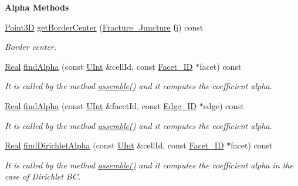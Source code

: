 \begin{Indent}{\bf Alpha Methods}\par
\begin{DoxyCompactItemize}
\item 
\hyperlink{classFVCode3D_1_1Point3D}{Point3D} \hyperlink{classFVCode3D_1_1StiffMatrix_a2702adc80c0667f24005a16672de0d39}{get\+Border\+Center} (\hyperlink{classFVCode3D_1_1StiffMatrix_ab6572f8976a3d7fc0d54d73888764252}{Fracture\+\_\+\+Juncture} fj) const 
\begin{DoxyCompactList}\small\item\em Border center. \end{DoxyCompactList}\item 
\hyperlink{namespaceFVCode3D_a40c1f5588a248569d80aa5f867080e83}{Real} \hyperlink{classFVCode3D_1_1StiffMatrix_a2365673b4791819e78c4c593e2f63b28}{find\+Alpha} (const \hyperlink{namespaceFVCode3D_a4bf7e328c75d0fd504050d040ebe9eda}{U\+Int} \&cell\+Id, const \hyperlink{classFVCode3D_1_1StiffMatrix_a317efdb4e4f2da856c747d1e0b80db20}{Facet\+\_\+\+ID} $\ast$facet) const 
\begin{DoxyCompactList}\small\item\em It is called by the method \hyperlink{classFVCode3D_1_1StiffMatrix_af63e81815a2ba8bd62a2156a80adce55}{assemble()} and it computes the coefficient alpha. \end{DoxyCompactList}\item 
\hyperlink{namespaceFVCode3D_a40c1f5588a248569d80aa5f867080e83}{Real} \hyperlink{classFVCode3D_1_1StiffMatrix_ae11e5b16122aed418d90e18530007e11}{find\+Alpha} (const \hyperlink{namespaceFVCode3D_a4bf7e328c75d0fd504050d040ebe9eda}{U\+Int} \&facet\+Id, const \hyperlink{classFVCode3D_1_1StiffMatrix_ac82be26370aa6eb17714078d9a2bf8df}{Edge\+\_\+\+ID} $\ast$edge) const 
\begin{DoxyCompactList}\small\item\em It is called by the method \hyperlink{classFVCode3D_1_1StiffMatrix_af63e81815a2ba8bd62a2156a80adce55}{assemble()} and it computes the coefficient alpha. \end{DoxyCompactList}\item 
\hyperlink{namespaceFVCode3D_a40c1f5588a248569d80aa5f867080e83}{Real} \hyperlink{classFVCode3D_1_1StiffMatrix_aec36126e4870fc3f94a2d36b831c739e}{find\+Dirichlet\+Alpha} (const \hyperlink{namespaceFVCode3D_a4bf7e328c75d0fd504050d040ebe9eda}{U\+Int} \&cell\+Id, const \hyperlink{classFVCode3D_1_1StiffMatrix_a317efdb4e4f2da856c747d1e0b80db20}{Facet\+\_\+\+ID} $\ast$facet) const 
\begin{DoxyCompactList}\small\item\em It is called by the method \hyperlink{classFVCode3D_1_1StiffMatrix_af63e81815a2ba8bd62a2156a80adce55}{assemble()} and it computes the coefficient alpha in the case of Dirichlet BC. \end{DoxyCompactList}\item 

\end{DoxyCompactItemize}
\end{Indent}
